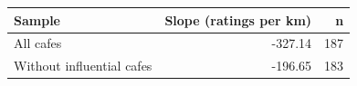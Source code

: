 \begingroup\footnotesize
\begin{tabular}{lrr}
  \toprule
Sample & Slope (ratings per km) & n \\ 
  \midrule
All cafes & -327.14 & 187 \\ 
  Without influential cafes & -196.65 & 183 \\ 
   \bottomrule
\end{tabular}
\endgroup
